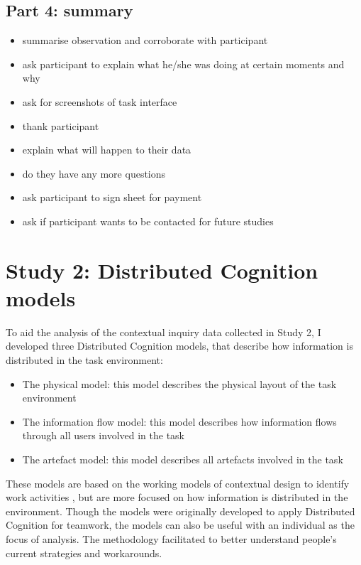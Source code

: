 \section{Part 4: summary}
\begin{itemize}
\item summarise observation and corroborate with participant
\item ask participant to explain what he/she was doing at certain moments and why
\item ask for screenshots of task interface
\item thank participant
\item explain what will happen to their data
\item do they have any more questions
\item ask participant to sign sheet for payment
\item ask if participant wants to be contacted for future studies
\end{itemize}

\chapter{Study 2: Distributed Cognition models}\label{ch:S2_Models}\label{ch:S2_Models}
To aid the analysis of the contextual inquiry data collected in Study 2, I developed three Distributed Cognition models, that describe how information is distributed in the task environment:

\begin{itemize}
\item 
The physical model: this model describes the physical layout of the task environment
\item 
The information flow model: this model describes how information flows through all users involved in the task
\item 
The artefact model: this model describes all artefacts involved in the task
\end{itemize}

These models are based on the working models of contextual design to identify work activities \citep{Holtzblatt2014}, but are more focused on how information is distributed in the environment. Though the models were originally developed to apply Distributed Cognition for teamwork, the models can also be useful with an individual as the focus of analysis. The methodology facilitated to better understand people’s current strategies and workarounds.

